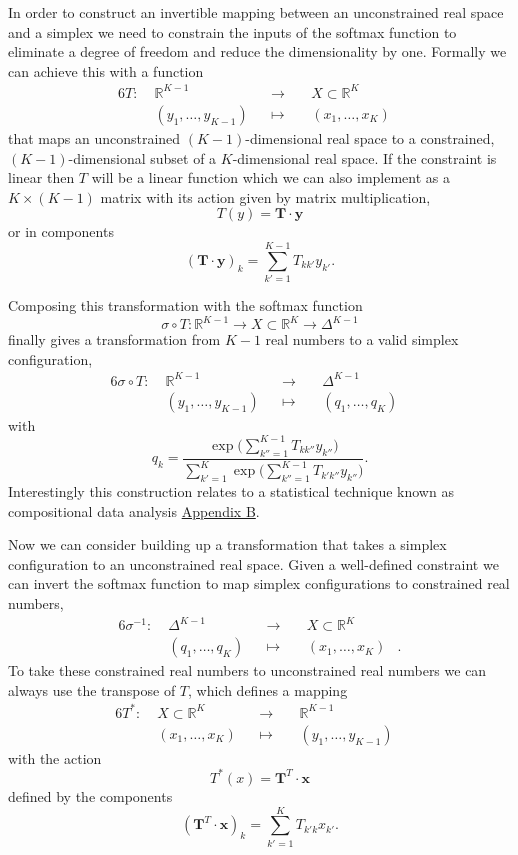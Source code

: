 \documentclass[
  letterpaper,
  DIV=11,
  numbers=noendperiod]{scrartcl}
\begin{document}
In order to construct an invertible mapping between an unconstrained
real space and a simplex we need to constrain the inputs of the softmax
function to eliminate a degree of freedom and reduce the dimensionality
by one. Formally we can achieve this with a function \begin{alignat*}{6}
T :\; & \mathbb{R}^{K - 1} & &\rightarrow& \; & X \subset \mathbb{R}^{K} &
\\
& (y_{1}, \ldots, y_{K - 1}) & &\mapsto& & (x_{1}, \ldots, x_{K}) &
\end{alignat*} that maps an unconstrained \((K - 1)\)-dimensional real
space to a constrained, \((K - 1)\)-dimensional subset of a
\(K\)-dimensional real space. If the constraint is linear then \(T\)
will be a linear function which we can also implement as a
\(K \times (K - 1)\) matrix with its action given by matrix
multiplication, \[
T(y) = \mathbf{T} \cdot \mathbf{y}
\] or in components \[
( \mathbf{T} \cdot \mathbf{y} )_{k} = \sum_{k' = 1}^{K - 1} T_{kk'} y_{k'}.
\]

Composing this transformation with the softmax function \[
\sigma \circ T :
\mathbb{R}^{K - 1} \rightarrow
X \subset \mathbb{R}^{K} \rightarrow \Delta^{K - 1}
\] finally gives a transformation from \(K - 1\) real numbers to a valid
simplex configuration, \begin{alignat*}{6}
\sigma \circ T :\; & \mathbb{R}^{K - 1} & &\rightarrow& \; & \Delta^{K - 1} &
\\
& (y_{1}, \ldots, y_{K - 1}) & &\mapsto& & (q_{1}, \ldots, q_{K}) &
\end{alignat*} with \[
q_{k} =
\frac{ \exp \big( \sum_{k'' = 1}^{K - 1} T_{kk''} y_{k''} \big) }
{ \sum_{k' = 1}^{K} \exp \big( \sum_{k'' = 1}^{K - 1} T_{k'k''} y_{k''} \big) }.
\] Interestingly this construction relates to a statistical technique
known as compositional data analysis \href{@sec:appendixb}{Appendix B}.

Now we can consider building up a transformation that takes a simplex
configuration to an unconstrained real space. Given a well-defined
constraint we can invert the softmax function to map simplex
configurations to constrained real numbers, \begin{alignat*}{6}
\sigma^{-1} :\; & \Delta^{K - 1} & &\rightarrow& \; & X \subset \mathbb{R}^{K} &
\\
& (q_{1}, \ldots, q_{K}) & &\mapsto& & (x_{1}, \ldots, x_{K}) &.
\end{alignat*} To take these constrained real numbers to unconstrained
real numbers we can always use the transpose of \(T\), which defines a
mapping \begin{alignat*}{6}
T^{*} :\; & X \subset \mathbb{R}^{K} & &\rightarrow& \; & \mathbb{R}^{K - 1} &
\\
& (x_{1}, \ldots, x_{K}) & &\mapsto& & (y_{1}, \ldots, y_{K - 1}) &
\end{alignat*} with the action \[
T^{*}(x) = \mathbf{T}^{T} \cdot \mathbf{x}
\] defined by the components \[
( \mathbf{T}^{T} \cdot \mathbf{x} )_{k} = \sum_{k' = 1}^{K} T_{k'k} x_{k'}.
\]
\end{document}
